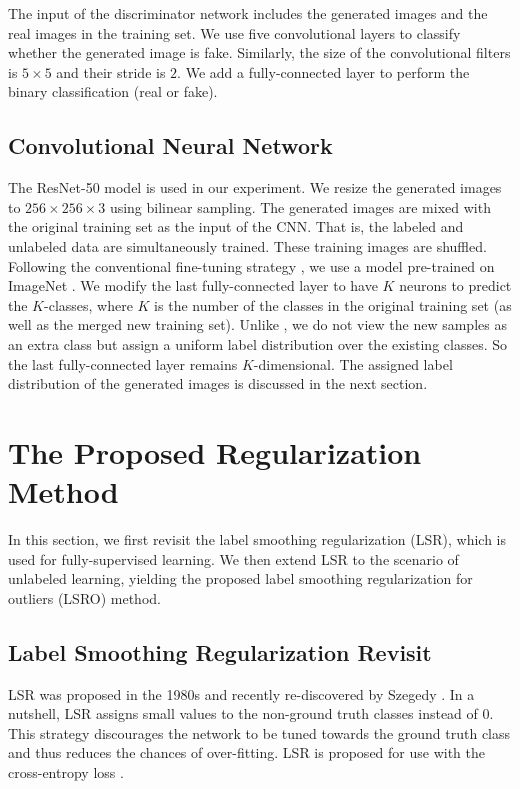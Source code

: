 \documentclass[10pt,twocolumn,letterpaper]{article}
\begin{document}
The input of the discriminator network includes the generated images and the real images in the training set. We use five convolutional layers to classify whether the generated image is fake. Similarly, the size of the convolutional filters is $5\times5$ and their stride is $2$. We add a fully-connected layer to perform the binary classification (real or fake).

\subsection{Convolutional Neural Network}
The ResNet-50 \cite{he2016deep} model is used in our experiment. We resize the generated images to $256\times256\times3$ using bilinear sampling. The generated images are mixed with the original training set as the input of the CNN. That is, the labeled and unlabeled data are simultaneously trained. These training images are shuffled. Following the conventional fine-tuning strategy \cite{zheng2016survey}, we use a model pre-trained on ImageNet \cite{russakovsky2015imagenet}. We modify the last fully-connected layer to have $K$ neurons to predict the $K$-classes, where $K$ is the number of the classes in the original training set (as well as the merged new training set). Unlike \cite{odena2016semi,salimans2016improved}, we do not view the new samples as an extra class but assign a uniform label distribution over the existing classes. So the last fully-connected layer remains $K$-dimensional. The assigned label distribution of the generated images is discussed in the next section.

\section{The Proposed Regularization Method} \label{loss}
In this section, we first revisit the label smoothing regularization (LSR), which is used for fully-supervised learning. We then extend LSR to the scenario of unlabeled learning, yielding the proposed label smoothing regularization for outliers (LSRO) method. 


\subsection{Label Smoothing Regularization Revisit}\label{sec:revisit}
LSR was proposed in the 1980s and recently re-discovered by Szegedy \etal \cite{szegedy2016rethinking}. In a nutshell, LSR assigns small values to the non-ground truth classes instead of $0$. This strategy discourages the network to be tuned towards the ground truth class and thus reduces the chances of over-fitting. LSR is proposed for use with the cross-entropy loss \cite{szegedy2016rethinking}. 
\end{document}
